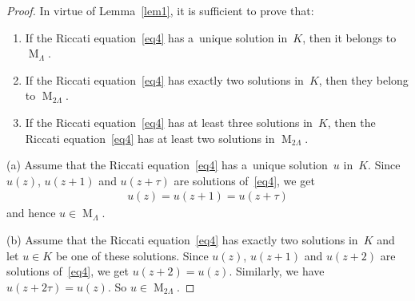 \documentclass[11pt]{article}
\numberwithin{equation}{section}
\begin{document}
\begin{proof}
In virtue of Lemma~\ref{lem1}, it is suf\/f\/icient to prove that:
\begin{enumerate}\itemsep=0pt
\item[(a)] If the Riccati equation~\eqref{eq4} has a~unique solution in~$K$, then it belongs to
$\operatorname{M}_{\Lambda}$.

\item[(b)] If the Riccati equation~\eqref{eq4} has exactly two solutions in~$K$, then they belong to
$\operatorname{M}_{2\Lambda}$.

\item[(c)] If the Riccati equation~\eqref{eq4} has at least three solutions in~$K$, then the Riccati equation~\eqref{eq4}
has at least two solutions in $\operatorname{M}_{2\Lambda}$.
\end{enumerate}

 (a) Assume that the Riccati equation~\eqref{eq4} has a~unique solution~$u$ in~$K$.
Since $u(z)$, $u(z+1)$ and $u(z+\tau)$ are solutions of~\eqref{eq4}, we get
\begin{gather*}
u(z)=u(z+1)=u(z+\tau)
\end{gather*}
and hence $u\in\operatorname{M}_{\Lambda}$.

(b) Assume that the Riccati equation~\eqref{eq4} has exactly two solutions in~$K$ and let $u\in K$ be one of these
solutions.
Since $u(z)$, $u(z+1)$ and $u(z+2)$ are solutions of~\eqref{eq4}, we get $ u(z+2)=u(z).
$ Similarly, we have $u(z+2\tau)=u(z)$.
So $u\in\operatorname{M}_{2\Lambda}$.


\end{proof}
\end{document}
